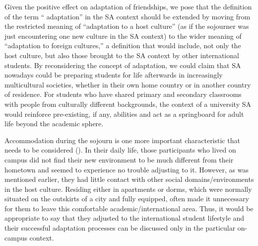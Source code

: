 \documentclass[output=paper]{langsci/langscibook}
\begin{document}
Given the positive effect on adaptation of  friendships, we pose that the definition of the term “ adaptation” in the SA context should be extended by moving from the restricted meaning of  “adaptation to a host culture” (as if the sojourner was just encountering one new culture in the SA context) to the wider meaning of  “adaptation to foreign cultures,” a definition that would include, not only the host culture, but also those brought to the SA context by other international students. By reconsidering the concept of adaptation, we could claim that SA nowadays could be preparing students for life afterwards in increasingly multicultural societies, whether in their own home country or in another country of residence. For students who have shared primary and secondary classrooms with people from culturally different backgrounds, the context of a university SA would reinforce pre-existing, if any,  abilities and act as a springboard for adult life beyond the academic sphere. 

Accommodation during the sojourn is one more important characteristic that needs to be considered (\citealt{VandeBergEtAl2009}). In their daily life, those participants who lived on campus did not find their new environment to be much different from their hometown and seemed to experience no trouble adjusting to it. However, as was mentioned earlier, they had little contact with other social domains/environments in the host culture. Residing either in apartments or dorms, which were normally situated on the outskirts of a city and fully equipped, often made it unnecessary for them to leave this comfortable academic/international area. Thus, it would be appropriate to say that they adjusted to the international student lifestyle and their successful adaptation processes can be discussed only in the particular on-campus context. 
\end{document}
